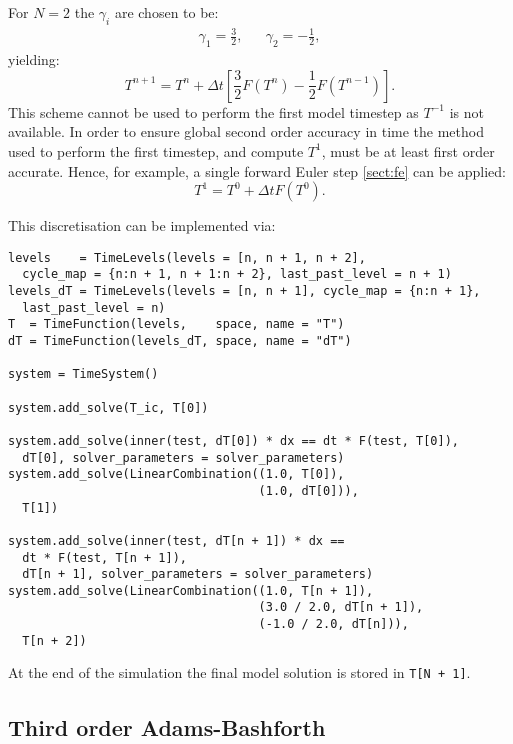 \documentclass[a4paper]{book}
\begin{document}
For $N = 2$ the $\gamma_i$ are chosen to be:
\begin{align}
  \gamma_1 = \frac{3}{2}, & & \gamma_2 = -\frac{1}{2},
\end{align}
yielding:
\begin{equation}
  T^{n + 1} = T^n + \Delta t \left[ \frac{3}{2} F(T^n) - \frac{1}{2} F(T^{n - 1}) \right].
\end{equation}
This scheme cannot be used to perform the first model timestep as $T^{-1}$ is
not available. In order to ensure global second order accuracy in time the
method used to perform the first timestep, and compute $T^1$, must be at least
first order accurate. Hence, for example, a single forward Euler step
\ref{sect:fe} can be applied:
\begin{equation}
  T^1 = T^0 + \Delta t F(T^0).
\end{equation}

This discretisation can be implemented via:
\begin{lstlisting}
levels    = TimeLevels(levels = [n, n + 1, n + 2],
  cycle_map = {n:n + 1, n + 1:n + 2}, last_past_level = n + 1)
levels_dT = TimeLevels(levels = [n, n + 1], cycle_map = {n:n + 1},
  last_past_level = n)
T  = TimeFunction(levels,    space, name = "T")
dT = TimeFunction(levels_dT, space, name = "dT")

system = TimeSystem()

system.add_solve(T_ic, T[0])

system.add_solve(inner(test, dT[0]) * dx == dt * F(test, T[0]),
  dT[0], solver_parameters = solver_parameters)
system.add_solve(LinearCombination((1.0, T[0]),
                                   (1.0, dT[0])),
  T[1])

system.add_solve(inner(test, dT[n + 1]) * dx ==
  dt * F(test, T[n + 1]),
  dT[n + 1], solver_parameters = solver_parameters)
system.add_solve(LinearCombination((1.0, T[n + 1]),
                                   (3.0 / 2.0, dT[n + 1]),
                                   (-1.0 / 2.0, dT[n])),
  T[n + 2])
\end{lstlisting}
At the end of the simulation the final model solution is stored in
\verb=T[N + 1]=.

\subsection{Third order Adams-Bashforth}
\end{document}
